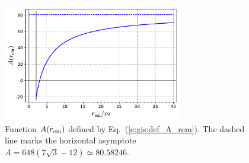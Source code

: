 \begin{figure}
\centerline{\includegraphics[width=0.7\textwidth]{gis_A_rem.pdf}}
\caption[]{\label{f:gis:A_rem} \footnotesize
Function $A(r_{\rm em})$ defined by Eq.~(\ref{e:gis:def_A_rem}).
The dashed line marks the horizontal asymptote $A = 648(7\sqrt{3} - 12) \simeq 80.58246$.}
\end{figure}


